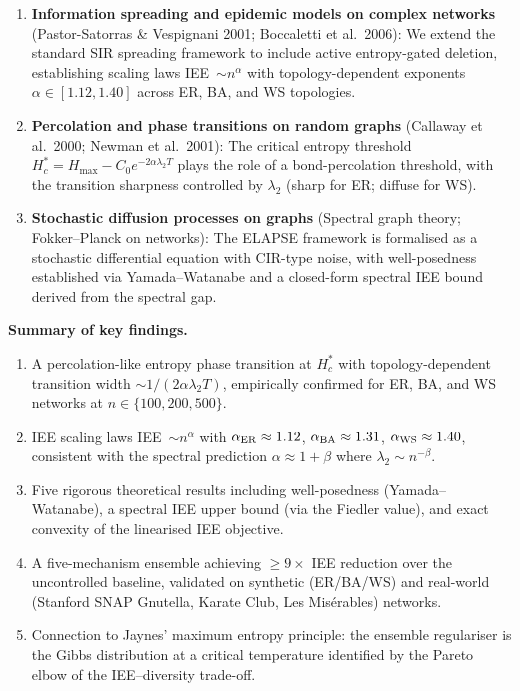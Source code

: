 \documentclass[12pt,a4paper]{article}
\begin{document}
\begin{enumerate}
  \item \textbf{Information spreading and epidemic models on complex networks}
    (Pastor-Satorras \& Vespignani 2001; Boccaletti et al.\ 2006):
    We extend the standard SIR spreading framework to include active entropy-gated
    deletion, establishing scaling laws IEE~$\sim n^\alpha$ with
    topology-dependent exponents $\alpha \in [1.12, 1.40]$ across ER, BA,
    and WS topologies.

  \item \textbf{Percolation and phase transitions on random graphs}
    (Callaway et al.\ 2000; Newman et al.\ 2001):
    The critical entropy threshold $H_c^* = H_{\max} - C_0 e^{-2\alpha\lambda_2 T}$
    plays the role of a bond-percolation threshold, with the transition sharpness
    controlled by $\lambda_2$ (sharp for ER; diffuse for WS).

  \item \textbf{Stochastic diffusion processes on graphs}
    (Spectral graph theory; Fokker--Planck on networks):
    The ELAPSE framework is formalised as a stochastic differential equation
    with CIR-type noise, with well-posedness established via Yamada--Watanabe
    and a closed-form spectral IEE bound derived from the spectral gap.
\end{enumerate}

\medskip

\noindent\textbf{Summary of key findings.}

\begin{enumerate}
  \item A percolation-like entropy phase transition at $H_c^*$ with
    topology-dependent transition width $\sim 1/(2\alpha\lambda_2 T)$,
    empirically confirmed for ER, BA, and WS networks at $n \in \{100, 200, 500\}$.
  \item IEE scaling laws IEE~$\sim n^\alpha$ with $\alpha_{\rm ER} \approx 1.12$,
    $\alpha_{\rm BA} \approx 1.31$, $\alpha_{\rm WS} \approx 1.40$,
    consistent with the spectral prediction $\alpha \approx 1 + \beta$
    where $\lambda_2 \sim n^{-\beta}$.
  \item Five rigorous theoretical results including well-posedness
    (Yamada--Watanabe), a spectral IEE upper bound (via the Fiedler value),
    and exact convexity of the linearised IEE objective.
  \item A five-mechanism ensemble achieving $\geq 9\times$ IEE reduction
    over the uncontrolled baseline, validated on synthetic (ER/BA/WS)
    and real-world (Stanford SNAP Gnutella, Karate Club, Les Mis\'erables) networks.
  \item Connection to Jaynes' maximum entropy principle: the ensemble
    regulariser is the Gibbs distribution at a critical temperature
    identified by the Pareto elbow of the IEE--diversity trade-off.
\end{enumerate}
\end{document}
